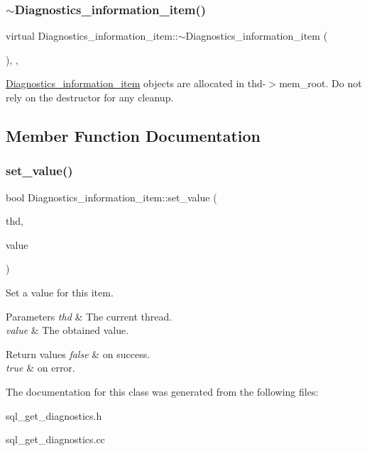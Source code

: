 \subsubsection{\texorpdfstring{$\sim$\+Diagnostics\+\_\+information\+\_\+item()}{~Diagnostics\_information\_item()}}
{\footnotesize\ttfamily virtual Diagnostics\+\_\+information\+\_\+item\+::$\sim$\+Diagnostics\+\_\+information\+\_\+item (\begin{DoxyParamCaption}{ }\end{DoxyParamCaption})\hspace{0.3cm}{\ttfamily [inline]}, {\ttfamily [protected]}, {\ttfamily [virtual]}}

\mbox{\hyperlink{classDiagnostics__information__item}{Diagnostics\+\_\+information\+\_\+item}} objects are allocated in thd-\/$>$mem\+\_\+root. Do not rely on the destructor for any cleanup. 

\subsection{Member Function Documentation}
\mbox{\label{classDiagnostics__information__item_a127b94424c2760818c42af7961522362}} 
\subsubsection{\texorpdfstring{set\+\_\+value()}{set\_value()}}
{\footnotesize\ttfamily bool Diagnostics\+\_\+information\+\_\+item\+::set\+\_\+value (\begin{DoxyParamCaption}\item[{T\+HD $\ast$}]{thd,  }\item[{\mbox{\hyperlink{classItem}{Item}} $\ast$$\ast$}]{value }\end{DoxyParamCaption})}

Set a value for this item.


\begin{DoxyParams}{Parameters}
{\em thd} & The current thread. \\
\hline
{\em value} & The obtained value.\\
\hline
\end{DoxyParams}

\begin{DoxyRetVals}{Return values}
{\em false} & on success. \\
\hline
{\em true} & on error. \\
\hline
\end{DoxyRetVals}


The documentation for this class was generated from the following files\+:\begin{DoxyCompactItemize}
\item 
sql\+\_\+get\+\_\+diagnostics.\+h\item 
sql\+\_\+get\+\_\+diagnostics.\+cc\end{DoxyCompactItemize}
